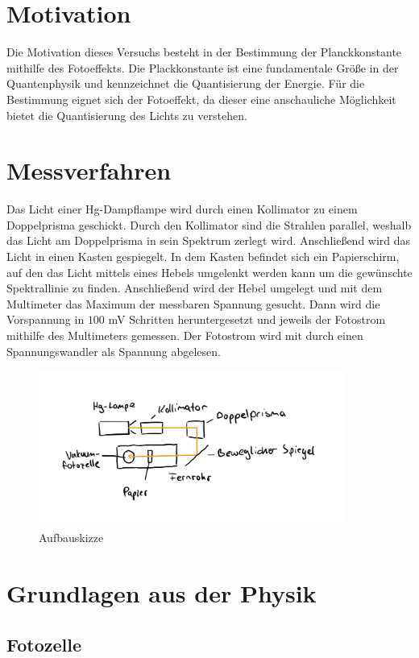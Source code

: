 \section{Motivation}
Die Motivation dieses Versuchs besteht in der Bestimmung der Planckkonstante mithilfe des Fotoeffekts.
Die Plackkonstante ist eine fundamentale Größe in der Quantenphysik und kennzeichnet die
Quantisierung der Energie. Für die Bestimmung eignet sich der Fotoeffekt,
da dieser eine anschauliche Möglichkeit bietet die Quantisierung des Lichts zu verstehen.


\section{Messverfahren}

Das Licht einer Hg-Dampflampe wird durch einen Kollimator zu einem Doppelprisma geschickt.
Durch den Kollimator sind die Strahlen parallel, weshalb das Licht am Doppelprisma in sein Spektrum zerlegt wird.
Anschließend wird das Licht in einen Kasten gespiegelt. In dem Kasten befindet sich ein Papierschirm,
auf den das Licht mittels eines Hebels umgelenkt werden kann um die gewünschte Spektrallinie zu finden.
Anschließend wird der Hebel umgelegt und mit dem Multimeter das Maximum der messbaren Spannung gesucht.
Dann wird die Vorspannung in $100$ mV Schritten heruntergesetzt und jeweils der Fotostrom mithilfe des Multimeters gemessen.
Der Fotostrom wird mit durch einen Spannungswandler als Spannung abgelesen.
\begin{figure}[h!]
    \centering
    \includegraphics[width=0.9\textwidth,]{35-Skizze.jpeg}
    \caption{Aufbauskizze}
\end{figure}
\section{Grundlagen aus der Physik}
\subsection{Fotozelle}

